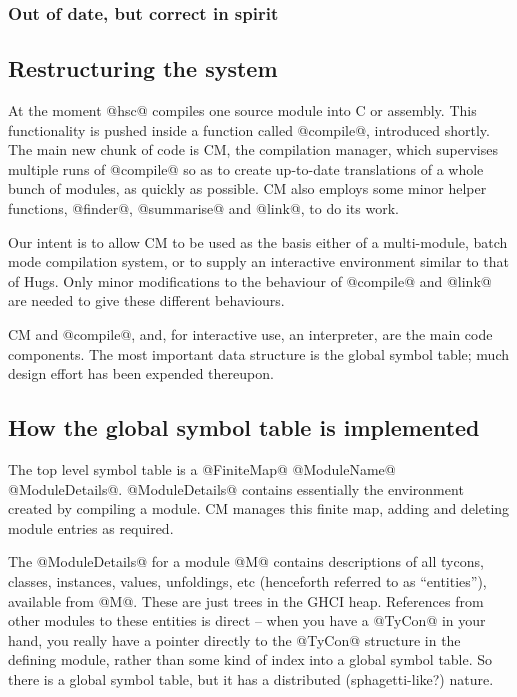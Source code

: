 \documentclass[11pt]{article}
\begin{document}
\subsubsection*{Out of date, but correct in spirit}

\subsection{Restructuring the system}

At the moment @hsc@ compiles one source module into C or assembly.
This functionality is pushed inside a function called @compile@,
introduced shortly.  The main new chunk of code is CM, the compilation manager,
which supervises multiple runs of @compile@ so as to create up-to-date
translations of a whole bunch of modules, as quickly as possible.
CM also employs some minor helper functions, @finder@, @summarise@ and
@link@, to do its work.

Our intent is to allow CM to be used as the basis either of a 
multi-module, batch mode compilation system, or to supply an
interactive environment similar to that of Hugs.
Only minor modifications to the behaviour of @compile@ and @link@ 
are needed to give these different behaviours.

CM and @compile@, and, for interactive use, an interpreter, are the
main code components.  The most important data structure is the global
symbol table; much design effort has been expended thereupon.


\subsection{How the global symbol table is implemented}

The top level symbol table is a @FiniteMap@ @ModuleName@
@ModuleDetails@.  @ModuleDetails@ contains essentially the environment
created by compiling a module.  CM manages this finite map, adding and
deleting module entries as required.

The @ModuleDetails@ for a module @M@ contains descriptions of all
tycons, classes, instances, values, unfoldings, etc (henceforth
referred to as ``entities''), available from @M@.  These are just
trees in the GHCI heap.  References from other modules to these
entities is direct -- when you have a @TyCon@ in your hand, you really
have a pointer directly to the @TyCon@ structure in the defining module,
rather than some kind of index into a global symbol table.  So there
is a global symbol table, but it has a distributed (sphagetti-like?)
nature.
\end{document}
